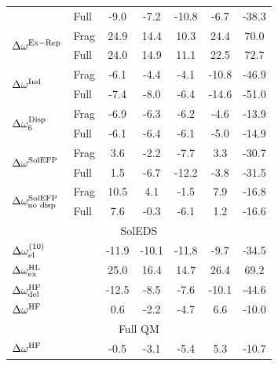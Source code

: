 \documentclass[a4paper,titlepage,twoside,fleqn,12pt]{book}
\begin{document}
\begin{refsection}
\begin{table}[t!]
\begin{tabular*}{1.0\textwidth}{@{\extracolsep{\fill} } ll ccccc }
                                               & Full &   -9.0   &  -7.2   &  -10.8   &   -6.7   & -38.3   \\
\multirow{2}{*}{$\Delta\omega^{\rm Ex-Rep}$}   & Frag &   24.9   &  14.4   &   10.3   &   24.4   &  70.0   \\
                                               & Full &   24.0   &  14.9   &   11.1   &   22.5   &  72.7   \\
\multirow{2}{*}{$\Delta\omega^{\rm Ind}$}      & Frag &   -6.1   &  -4.4   &   -4.1   &  -10.8   & -46.9   \\
                                               & Full &   -7.4   &  -8.0   &   -6.4   &  -14.6   & -51.0   \\
\multirow{2}{*}{$\Delta\omega^{\rm Disp}_6$}   & Frag &   -6.9   &  -6.3   &   -6.2   &   -4.6   & -13.9   \\
                                               & Full &   -6.1   &  -6.4   &   -6.1   &   -5.0   & -14.9   \\
\multirow{2}{*}{$\Delta\omega^{\rm SolEFP}$}   & Frag &    3.6   &  -2.2   &   -7.7   &    3.3   & -30.7   \\
                                               & Full &    1.5   &  -6.7   &  -12.2   &   -3.8   & -31.5   \\
\multirow{2}{*}{$\Delta\omega^{\rm SolEFP}_{\text{no disp}}$}   
                                               & Frag &   10.5   &   4.1   &   -1.5   &    7.9   & -16.8   \\
                                               & Full &    7.6   &  -0.3   &   -6.1   &    1.2   & -16.6   \\
\multicolumn{7}{c}{SolEDS} \\  \hline
\multicolumn{2}{l}{$\Delta\omega^{(10)}_{\rm el}$}    &  -11.9   & -10.1   &  -11.8   &   -9.7   & -34.5   \\
\multicolumn{2}{l}{$\Delta\omega^{\rm HL}_{\rm ex}$}  &   25.0   &  16.4   &   14.7   &   26.4   &  69.2   \\
\multicolumn{2}{l}{$\Delta\omega^{\rm HF}_{\rm del}$} &  -12.5   &  -8.5   &   -7.6   &  -10.1   & -44.6   \\
\multicolumn{2}{l}{$\Delta\omega^{\rm HF}$}           &    0.6   &  -2.2   &   -4.7   &    6.6   & -10.0   \\
\multicolumn{7}{c}{Full QM} \\  \hline
\multicolumn{2}{l}{$\Delta\omega^{\rm HF}$}           &   -0.5   &  -3.1   &   -5.4   &    5.3   & -10.7   \\

\end{tabular*}
\end{table}
\end{refsection}
\end{document}
